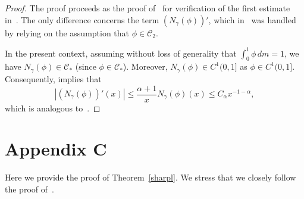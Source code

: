 \documentclass[12pt,reqno,a4paper]{article}
\begin{document}
\begin{proof}
	The proof proceeds as the proof of~\cite[Lemma 12]{DGTS} for verification of the first estimate in~\cite[(15)]{DGTS}. The only difference concerns the term $(N_\gamma (\phi))'$, which in~\cite{DGTS} was handled by relying on the assumption that $\phi \in \mathcal C_2$.
	
	In the present context, assuming without loss of generality that $\int_0^1\phi \, dm=1$, we have $N_\gamma (\phi)\in \mathcal C_*$ (since $\phi \in \mathcal C_*$). Moreover, $N_\gamma (\phi)\in C^1(0, 1]$ as $\phi \in C^1(0, 1]$. Consequently, \cite[Remark 1]{DGTS} implies that 
	\[
	|(N_\gamma (\phi))'(x)|\le \frac{\alpha+1}{x}N_\gamma (\phi)(x)\le C_\alpha x^{-1-\alpha},
	\]
	which is analogous to~\cite[(18)]{DGTS}. 
\end{proof}


\section{Appendix C}\label{AppB}
Here we provide the proof of Theorem~\ref{sharpl}. We stress that we closely follow the proof of~\cite[Theorem 14]{DGTS}.
\end{document}
